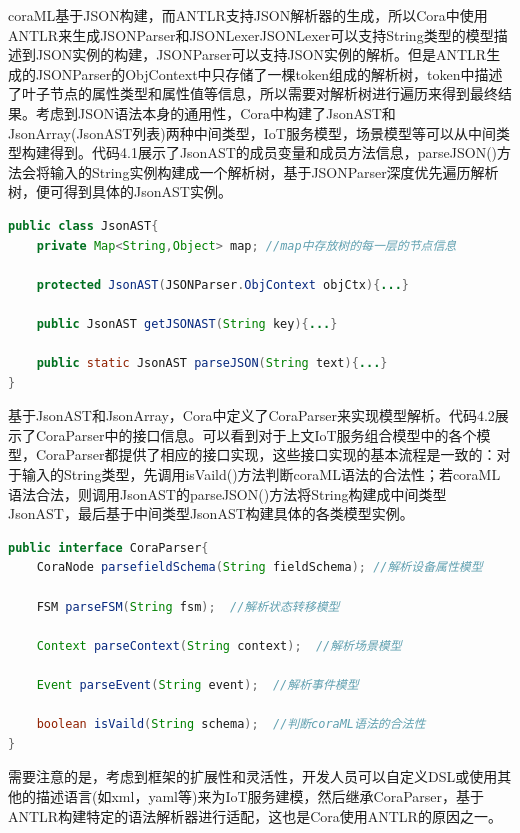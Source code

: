 \documentclass[winfonts,master,twoside]{njuthesis}
\begin{document}
coraML基于JSON构建，而ANTLR支持JSON解析器的生成，所以Cora中使用ANTLR来生成JSONParser和JSONLexerJSONLexer可以支持String类型的模型描述到JSON实例的构建，JSONParser可以支持JSON实例的解析。但是ANTLR生成的JSONParser的ObjContext中只存储了一棵token组成的解析树，token中描述了叶子节点的属性类型和属性值等信息，所以需要对解析树进行遍历来得到最终结果。考虑到JSON语法本身的通用性，Cora中构建了JsonAST和JsonArray(JsonAST列表)两种中间类型，IoT服务模型，场景模型等可以从中间类型构建得到。代码4.1展示了JsonAST的成员变量和成员方法信息，parseJSON()方法会将输入的String实例构建成一个解析树，基于JSONParser深度优先遍历解析树，便可得到具体的JsonAST实例。

\begin{lstlisting}[caption={JsonAST类型},label={lst:JsonAST},language=java,basicstyle=\footnotesize]
public class JsonAST{
    private Map<String,Object> map; //map中存放树的每一层的节点信息
    
    protected JsonAST(JSONParser.ObjContext objCtx){...}
    
    public JsonAST getJSONAST(String key){...} 
    
    public static JsonAST parseJSON(String text){...} 
}
\end{lstlisting}

基于JsonAST和JsonArray，Cora中定义了CoraParser来实现模型解析。代码4.2展示了CoraParser中的接口信息。可以看到对于上文IoT服务组合模型中的各个模型，CoraParser都提供了相应的接口实现，这些接口实现的基本流程是一致的：对于输入的String类型，先调用isVaild()方法判断coraML语法的合法性；若coraML语法合法，则调用JsonAST的parseJSON()方法将String构建成中间类型JsonAST，最后基于中间类型JsonAST构建具体的各类模型实例。
\begin{lstlisting}[caption={CoraParser接口信息},label={lst:coraParser_interface},language=java,basicstyle=\footnotesize]
public interface CoraParser{
    CoraNode parsefieldSchema(String fieldSchema); //解析设备属性模型
    
    FSM parseFSM(String fsm);  //解析状态转移模型
    
    Context parseContext(String context);  //解析场景模型
    
    Event parseEvent(String event);  //解析事件模型
    
    boolean isVaild(String schema);  //判断coraML语法的合法性
}
\end{lstlisting}

需要注意的是，考虑到框架的扩展性和灵活性，开发人员可以自定义DSL或使用其他的描述语言(如xml，yaml等)来为IoT服务建模，然后继承CoraParser，基于ANTLR构建特定的语法解析器进行适配，这也是Cora使用ANTLR的原因之一。
\end{document}
